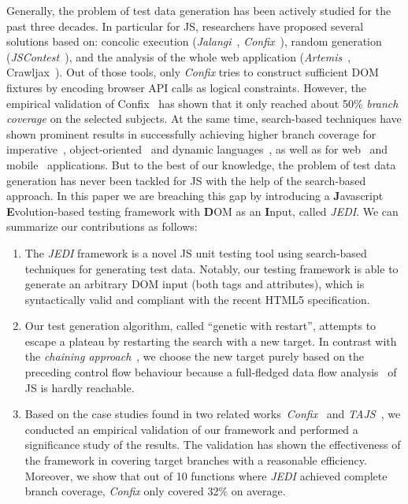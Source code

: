 Generally, the problem of test data generation has been actively studied for the past three decades. In particular for JS, researchers have proposed several solutions based on: concolic execution (\emph{Jalangi}~\cite{sen2013jalangi}, \emph{Confix}~\cite{amin:ase15}), random generation (\emph{JSContest}~\cite{heidegger2010contract}), and the analysis of the whole web application (\emph{Artemis}~\cite{artemis2011}, Crawljax~\cite{mesbah2012crawling}). Out of those tools, only \emph{Confix} tries to construct sufficient DOM fixtures by encoding browser API calls as logical constraints. However, the empirical validation of Confix~\cite{amin:ase15} has shown that it only reached about 50\% \emph{branch coverage} on the selected subjects. At the same time, search-based techniques have shown prominent results in successfully achieving higher branch coverage for imperative~\cite{wegener2001evolutionary}, object-oriented~\cite{fraser2011evosuite} and dynamic languages~\cite{irawan2016test, wibowo2015unit}, as well as for web~\cite{alshahwan2011automated} and mobile~\cite{mao2016sapienz} applications. But to the best of our knowledge, the problem of test data generation has never been tackled for JS with the help of the search-based approach. In this paper we are breaching this gap by introducing a \textbf{J}avascript \textbf{E}volution-based testing framework with \textbf{D}OM as an \textbf{I}nput, called \emph{JEDI}. We can summarize our contributions as follows:
\begin{enumerate}[leftmargin=5mm]
\item The \emph{JEDI} framework is a novel JS unit testing tool using search-based techniques for generating test data. Notably, our testing framework is able to generate an arbitrary DOM input (both tags and attributes), which is syntactically valid and compliant with the recent HTML5 specification.
\item Our test generation algorithm, called ``genetic with restart'', attempts to escape a plateau by restarting the search with a new target. In contrast with the \emph{chaining approach}~\cite{ferguson1996chaining}, we choose the new target purely based on the preceding control flow behaviour because a full-fledged data flow analysis~\cite{jang2009points} of JS is hardly reachable.
\item Based on the case studies found in two related works~\emph{Confix}~\cite{amin:ase15} and \emph{TAJS}~\cite{dom2011}, we conducted an empirical validation of our framework and performed a significance study of the results. The validation has shown the effectiveness of the framework in covering target branches with a reasonable efficiency. Moreover, we show that out of 10 functions where \emph{JEDI} achieved complete branch coverage, \emph{Confix} only covered 32\% on average.
\end{enumerate}

